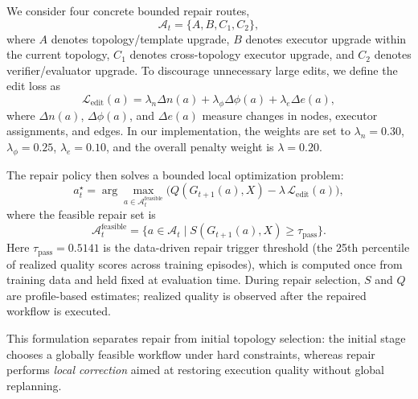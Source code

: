\documentclass[manuscript,review,anonymous]{acmart}
\begin{document}
We consider four concrete bounded repair routes,
\begin{equation}
\mathcal{A}_t=\{A,B,C_1,C_2\},
\end{equation}
where $A$ denotes topology/template upgrade, $B$ denotes executor upgrade within the current topology, $C_1$ denotes cross-topology executor upgrade, and $C_2$ denotes verifier/evaluator upgrade.
To discourage unnecessary large edits, we define the edit loss as
\begin{equation}
\mathcal{L}_{\mathrm{edit}}(a)
=
\lambda_n\Delta n(a)+\lambda_\phi\Delta\phi(a)+\lambda_e\Delta e(a),
\label{eq:edit_loss}
\end{equation}
where $\Delta n(a)$, $\Delta\phi(a)$, and $\Delta e(a)$ measure changes in nodes, executor assignments, and edges.
In our implementation, the weights are set to $\lambda_n=0.30$, $\lambda_\phi=0.25$, $\lambda_e=0.10$, and the overall penalty weight is $\lambda=0.20$.

The repair policy then solves a bounded local optimization problem:
\begin{equation}
a_t^\star
=
\arg\max_{a\in\mathcal{A}_t^{\mathrm{feasible}}}
\Big(
Q(G_{t+1}(a),X)-\lambda\,\mathcal{L}_{\mathrm{edit}}(a)
\Big),
\label{eq:repair_obj}
\end{equation}
where the feasible repair set is
\begin{equation}
\mathcal{A}_t^{\mathrm{feasible}}
=
\{a\in\mathcal{A}_t \mid S(G_{t+1}(a),X)\ge\tau_{\mathrm{pass}}\}.
\label{eq:repair_feasible}
\end{equation}
Here $\tau_{\mathrm{pass}}=0.5141$ is the data-driven repair trigger threshold (the 25th percentile of realized quality scores across training episodes), which is computed once from training data and held fixed at evaluation time. During repair selection, $S$ and $Q$ are profile-based estimates; realized quality is observed after the repaired workflow is executed.

This formulation separates repair from initial topology selection:
the initial stage chooses a globally feasible workflow under hard constraints, whereas repair performs \emph{local correction} aimed at restoring execution quality without global replanning.
\end{document}
